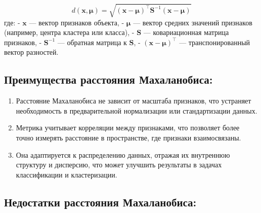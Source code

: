 \[
d(\mathbf{x}, \mathbf{\mu}) = \sqrt{ (\mathbf{x} - \mathbf{\mu})^\top \mathbf{S}^{-1} (\mathbf{x} - \mathbf{\mu}) }
\]
\newline
где:
\newline
- \( \mathbf{x} \) — вектор признаков объекта, \newline
- \( \mathbf{\mu} \) — вектор средних значений признаков (например, центра кластера или класса), \newline
- \( \mathbf{S} \) — ковариационная матрица признаков, \newline
- \( \mathbf{S}^{-1} \) — обратная матрица к \( \mathbf{S} \), \newline
- \( (\mathbf{x} - \mathbf{\mu})^\top \) — транспонированный вектор разностей. \newline

\subsection{Преимущества расстояния Махаланобиса:}

\begin{enumerate}
    \item Расстояние Махаланобиса не зависит от масштаба признаков, что устраняет необходимость в предварительной нормализации или стандартизации данных.

    \item Метрика учитывает корреляции между признаками, что позволяет более точно измерять расстояние в пространстве, где признаки взаимосвязаны.

    \item Она адаптируется к распределению данных, отражая их внутреннюю структуру и дисперсию, что может улучшить результаты в задачах классификации и кластеризации.
\end{enumerate}

\subsection{Недостатки расстояния Махаланобиса:}

